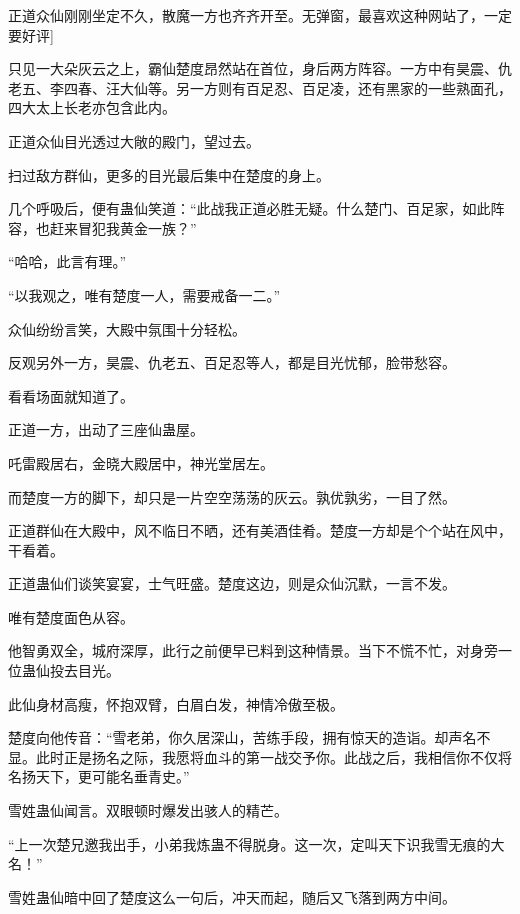 
\begin{this_body}



正道众仙刚刚坐定不久，散魔一方也齐齐开至。无弹窗，最喜欢这种网站了，一定要好评]

只见一大朵灰云之上，霸仙楚度昂然站在首位，身后两方阵容。一方中有昊震、仇老五、李四春、汪大仙等。另一方则有百足忍、百足凌，还有黑家的一些熟面孔，四大太上长老亦包含此内。

正道众仙目光透过大敞的殿门，望过去。

扫过敌方群仙，更多的目光最后集中在楚度的身上。

几个呼吸后，便有蛊仙笑道：“此战我正道必胜无疑。什么楚门、百足家，如此阵容，也赶来冒犯我黄金一族？”

“哈哈，此言有理。”

“以我观之，唯有楚度一人，需要戒备一二。”

众仙纷纷言笑，大殿中氛围十分轻松。

反观另外一方，昊震、仇老五、百足忍等人，都是目光忧郁，脸带愁容。

看看场面就知道了。

正道一方，出动了三座仙蛊屋。

吒雷殿居右，金晓大殿居中，神光堂居左。

而楚度一方的脚下，却只是一片空空荡荡的灰云。孰优孰劣，一目了然。

正道群仙在大殿中，风不临日不晒，还有美酒佳肴。楚度一方却是个个站在风中，干看着。

正道蛊仙们谈笑宴宴，士气旺盛。楚度这边，则是众仙沉默，一言不发。

唯有楚度面色从容。

他智勇双全，城府深厚，此行之前便早已料到这种情景。当下不慌不忙，对身旁一位蛊仙投去目光。

此仙身材高瘦，怀抱双臂，白眉白发，神情冷傲至极。

楚度向他传音：“雪老弟，你久居深山，苦练手段，拥有惊天的造诣。却声名不显。此时正是扬名之际，我愿将血斗的第一战交予你。此战之后，我相信你不仅将名扬天下，更可能名垂青史。”

雪姓蛊仙闻言。双眼顿时爆发出骇人的精芒。

“上一次楚兄邀我出手，小弟我炼蛊不得脱身。这一次，定叫天下识我雪无痕的大名！”

雪姓蛊仙暗中回了楚度这么一句后，冲天而起，随后又飞落到两方中间。


\end{this_body}
